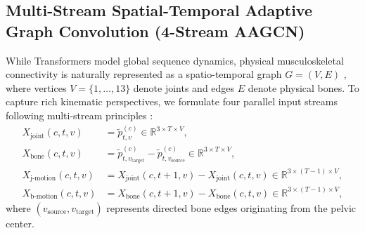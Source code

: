 \documentclass[preprint,12pt]{elsarticle}
\begin{document}
\subsection{Multi-Stream Spatial-Temporal Adaptive Graph Convolution (4-Stream AAGCN)}
While Transformers model global sequence dynamics, physical musculoskeletal connectivity is naturally represented as a spatio-temporal graph $G = (V, E)$ \cite{yan2018}, where vertices $V = \{1, \dots, 13\}$ denote joints and edges $E$ denote physical bones. To capture rich kinematic perspectives, we formulate four parallel input streams following multi-stream principles \cite{shi2019two,shi2020skeleton}:
\begin{align}
    X_{\text{joint}}(c, t, v) &= \tilde{p}_{t, v}^{(c)} \in \mathbb{R}^{3 \times T \times V}, \\
    X_{\text{bone}}(c, t, v) &= \tilde{p}_{t, v_{\text{target}}}^{(c)} - \tilde{p}_{t, v_{\text{source}}}^{(c)} \in \mathbb{R}^{3 \times T \times V}, \\
    X_{\text{j-motion}}(c, t, v) &= X_{\text{joint}}(c, t+1, v) - X_{\text{joint}}(c, t, v) \in \mathbb{R}^{3 \times (T-1) \times V}, \\
    X_{\text{b-motion}}(c, t, v) &= X_{\text{bone}}(c, t+1, v) - X_{\text{bone}}(c, t, v) \in \mathbb{R}^{3 \times (T-1) \times V},
\end{align}
where $(v_{\text{source}}, v_{\text{target}})$ represents directed bone edges originating from the pelvic center.
\end{document}
